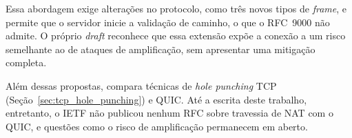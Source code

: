 Essa abordagem exige alterações no protocolo, como três novos tipos de \textit{frame}, e permite que o servidor inicie a validação de caminho, o que o RFC~9000 não admite. O próprio \textit{draft} reconhece que essa extensão expõe a conexão a um risco semelhante ao de ataques de amplificação, sem apresentar uma mitigação completa.

Além dessas propostas, \citep{liang2024nat} compara técnicas de \textit{hole punching} TCP (Seção~\ref{sec:tcp_hole_punching}) e QUIC. Até a escrita deste trabalho, entretanto, o IETF não publicou nenhum RFC sobre travessia de NAT com o QUIC, e questões como o risco de amplificação permanecem em aberto.

